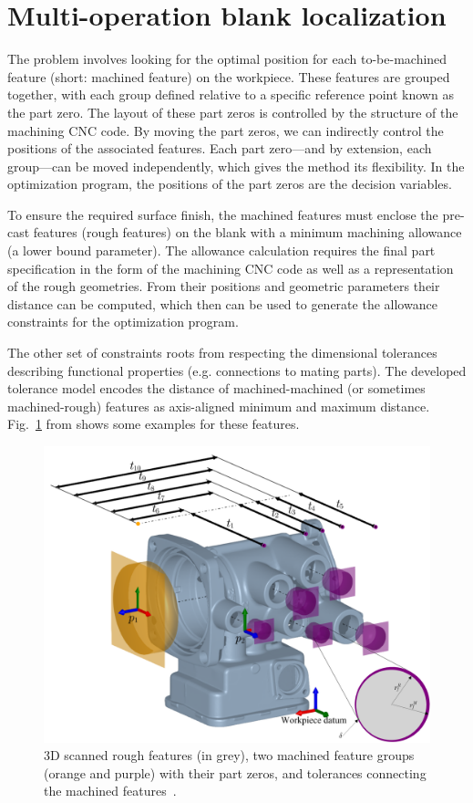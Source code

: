 \documentclass{juliacon}
\begin{document}
\section{Multi-operation blank localization}
\label{sec:algo}

The problem involves looking for the optimal position for each to-be-machined feature (short: machined feature) on the workpiece.
These features are grouped together, with each group defined relative to a specific reference point known as the part zero.
The layout of these part zeros is controlled by the structure of the machining CNC code.
By moving the part zeros, we can indirectly control the positions of the associated features.
Each part zero—and by extension, each group—can be moved independently, which gives the method its flexibility.
In the optimization program, the positions of the part zeros are the decision variables.

To ensure the required surface finish, the machined features must enclose the pre-cast features (rough features) on the blank with a minimum machining allowance (a lower bound parameter).
The allowance calculation requires the final part specification in the form of the machining CNC code as well as a representation of the rough geometries.
From their positions and geometric parameters their distance can be computed, which then can be used to generate the allowance constraints for the optimization program.

The other set of constraints roots from respecting the dimensional tolerances describing functional properties (e.g. connections to mating parts).
The developed tolerance model encodes the distance of machined-machined (or sometimes machined-rough) features as axis-aligned minimum and maximum distance.
Fig.~\ref{fig:hatfig} from \cite{cserteg:2023_Annals} shows some examples for these features.

\begin{figure}[b]
	\centerline{\includegraphics[width=0.95\columnwidth]{cirp-annals-2023-figure-2.png}}
	\caption{3D scanned rough features (in grey), two machined feature groups (orange and purple) with their part zeros, and tolerances connecting the machined features~\cite{cserteg:2023_Annals}.}
	\label{fig:hatfig}
\end{figure}
\end{document}
